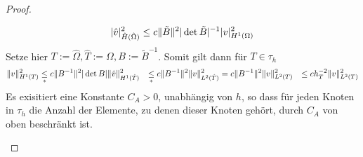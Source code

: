 \begin{proof}
\begin{enumerate}
      \begin{equation*}
        |\hat{v}|^2_{\hat{H}(\hat{\Omega})} \leq c \|\tilde{B}\|^2 |\det \tilde{B}|^{-1} |v|^2_{H^1(\Omega)}
      \end{equation*}
      Setze hier $T:=\hat{\Omega}, \hat{T}:=\Omega, B:=\tilde{B}^{-1}$. Somit gilt dann für $T\in\tau_h$
      \begin{align}
        \|v\|^2_{H^1(T)} &\underset{*}{\leq} c\|B^{-1}\|^2 |\det B| \|\hat{v}\|^2_{H^1(\hat{T})}
        &\underset{*}{\leq} c\|B^{-1}\|^2 \|v\|^2_{L^2(\hat{T})}
        &= c\|B^{-1}\|^2 \|v\|^2_{L^2(T)}
        &\leq c h^{-2}_T \|v\|^2_{L^2(T)}
        \label{}
      \end{align}
      Es exisitiert eine Konstante $C_A>0$, unabhängig von $h$, so dass für jeden Knoten in $\tau_h$ die Anzahl der Elemente, zu denen dieser Knoten gehört, durch $C_A$ von oben beschränkt ist. 
  \end{enumerate}
\end{proof}
